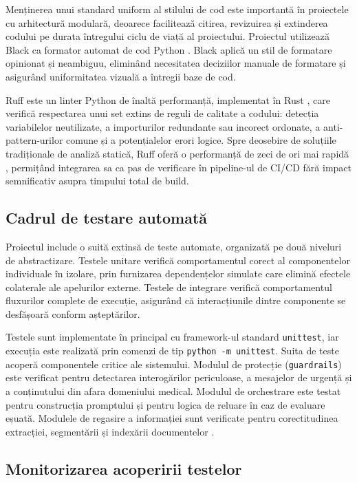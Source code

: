 \documentclass[12pt, a4paper, oneside, romanian]{teza-upb}
\begin{document}
Menținerea unui standard uniform al stilului de cod este importantă în proiectele cu arhitectură modulară, deoarece facilitează citirea, revizuirea și extinderea codului pe durata întregului ciclu de viață al proiectului. Proiectul utilizează Black ca formator automat de cod Python \cite{black_doc}. Black aplică un stil de formatare opinionat și neambiguu, eliminând necesitatea deciziilor manuale de formatare și asigurând uniformitatea vizuală a întregii baze de cod.

Ruff este un linter Python de înaltă performanță, implementat în Rust \cite{ruff_doc}, care verifică respectarea unui set extins de reguli de calitate a codului: detecția variabilelor neutilizate, a importurilor redundante sau incorect ordonate, a anti-pattern-urilor comune și a potențialelor erori logice. Spre deosebire de soluțiile tradiționale de analiză statică, Ruff oferă o performanță de zeci de ori mai rapidă \cite{ruff_doc}, permițând integrarea sa ca pas de verificare în pipeline-ul de CI/CD fără impact semnificativ asupra timpului total de build.

\subsection{Cadrul de testare automată}

Proiectul include o suită extinsă de teste automate, organizată pe două niveluri de abstractizare. Testele unitare verifică comportamentul corect al componentelor individuale în izolare, prin furnizarea dependențelor simulate care elimină efectele colaterale ale apelurilor externe. Testele de integrare verifică comportamentul fluxurilor complete de execuție, asigurând că interacțiunile dintre componente se desfășoară conform așteptărilor.

Testele sunt implementate în principal cu framework-ul standard \texttt{unittest}, iar execuția este realizată prin comenzi de tip \texttt{python -m unittest}. Suita de teste acoperă componentele critice ale sistemului. Modulul de protecție (\texttt{guardrails}) este verificat pentru detectarea interogărilor periculoase, a mesajelor de urgență și a conținutului din afara domeniului medical. Modulul de orchestrare este testat pentru construcția promptului și pentru logica de reluare în caz de evaluare eșuată. Modulele de regasire a informației sunt verificate pentru corectitudinea extracției, segmentării și indexării documentelor \cite{python_unittest}.

\subsection{Monitorizarea acoperirii testelor}
\end{document}
